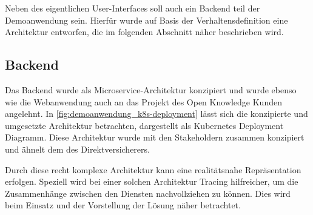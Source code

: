 









Neben des eigentlichen User-Interfaces soll auch ein Backend teil der Demoanwendung sein. Hierfür wurde auf Basis der Verhaltensdefinition eine Architektur entworfen, die im folgenden Abschnitt näher beschrieben wird.

\subsection{Backend}

Das Backend wurde als Microservice-Architektur konzipiert und wurde ebenso wie die Webanwendung auch an das Projekt des Open Knowledge Kunden angelehnt. In \autoref{fig:demoanwendung_k8s-deployment} lässt sich die konzipierte und umgesetzte Architektur betrachten, dargestellt als Kubernetes \cite{KubernetesComponents} Deployment Diagramm. Diese Architektur wurde mit den Stakeholdern zusammen konzipiert und ähnelt dem des Direktversicherers.

Durch diese recht komplexe Architektur kann eine realitätsnahe Repräsentation erfolgen. Speziell wird bei einer solchen Architektur Tracing hilfreicher, um die Zusammenhänge zwischen den Diensten nachvollziehen zu können. Dies wird beim Einsatz und der Vorstellung der Lösung näher betrachtet.

